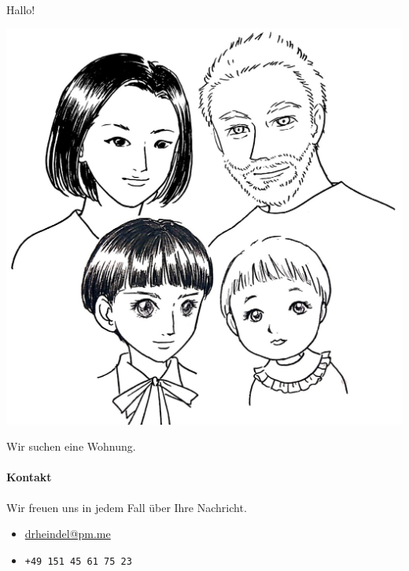 \documentclass[landscape,a4paper,12pt]{article}
\begin{document}
\noindent%
~\\[0ex]
\begin{minipage}[c]{.47\linewidth}
  \Huge Hallo!
  \begin{center}
    \includegraphics[width=\linewidth]{picNarrow.jpeg}
  \end{center}
  \Large Wir suchen eine Wohnung.
  \vfill
  
  \normalsize
  
\paragraph{Kontakt}
Wir freuen uns in jedem Fall über Ihre Nachricht.
\begin{itemize}
\item \url{drheindel@pm.me}
\item \texttt{+49 151 45 61 75 23}
\end{itemize}
\end{minipage}%
\quad\quad\quad
\end{document}
